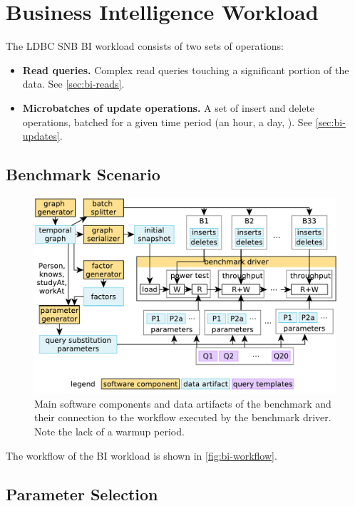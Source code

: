\chapter{Business Intelligence Workload}
\label{sec:bi}

The LDBC SNB BI workload consists of two sets of operations:

\begin{itemize}
\item \textbf{Read queries.} Complex read queries touching a significant portion of the data. See \autoref{sec:bi-reads}.
\item \textbf{Microbatches of update operations.} A set of insert and delete operations, batched for a given time period (\eg an hour, a day, \etc). See \autoref{sec:bi-updates}.
\end{itemize}

\section{Benchmark Scenario}
\label{sec:bi-benchmark-scenario}

\begin{figure}[H]
    \centering
    \includegraphics[scale=\yedscale]{figures/bi-workflow}
    \caption{Main software components and data artifacts of the benchmark and their connection to the workflow executed by the benchmark driver. Note the lack of a warmup period.}
    \label{fig:bi-workflow}
\end{figure}

The workflow of the BI workload is shown in \autoref{fig:bi-workflow}.

\section{Parameter Selection}
\label{sec:bi-paramgen}

